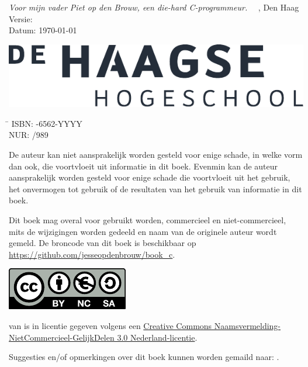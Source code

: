 \maketitle

\hspace*{0em}
\vfill
\textsl{Voor mijn vader Piet op den Brouw, een die-hard C-programmeur.}
\vfill
\textcopyright\the\year\ \ \bookauthor, Den Haag\\
Versie: \bookversion\\
Datum: \today

\vspace*{.25cm}
\ifusebookasbook\else
\includegraphics[scale=0.5]{images/HHS_NL_grijs_FC}
\fi

\ifusebookasbook
\vspace*{1cm}
\begin{tabbing}
\hspace{1.2cm}\=\kill
 ISBN: -6562-YYYY \\ 
 NUR:  /989
\end{tabbing}
\fi

\vspace*{1cm}
De auteur kan niet aansprakelijk worden gesteld voor enige schade, in welke vorm dan
ook, die voortvloeit uit informatie in dit boek. Evenmin kan de auteur aansprakelijk
worden gesteld voor enige schade die voortvloeit uit het gebruik, het onvermogen tot
gebruik of de resultaten van het gebruik van informatie in dit boek.

\vspace*{0.5cm}
Dit boek mag overal voor gebruikt worden, commercieel en niet-commercieel, mits de
wijzigingen worden gedeeld en naam van de originele auteur wordt gemeld. De broncode
van dit boek is beschikbaar op \url{https://github.com/jesseopdenbrouw/book_c}.


\vspace*{2cm}
\includegraphics{images/by-nc-sa_eu.pdf}
\par
{\small%
\booktitle{} van \bookauthor{} is in licentie gegeven volgens
een \href{http://creativecommons.org/licenses/by-nc-sa/3.0/nl/}{Creative Commons
Naamsvermelding-NietCommercieel-GelijkDelen 3.0 Nederland-licentie}.

Suggesties en/of opmerkingen over dit boek kunnen worden gemaild naar:
\href{mailto:\bookemail}{\bookemail}.}
